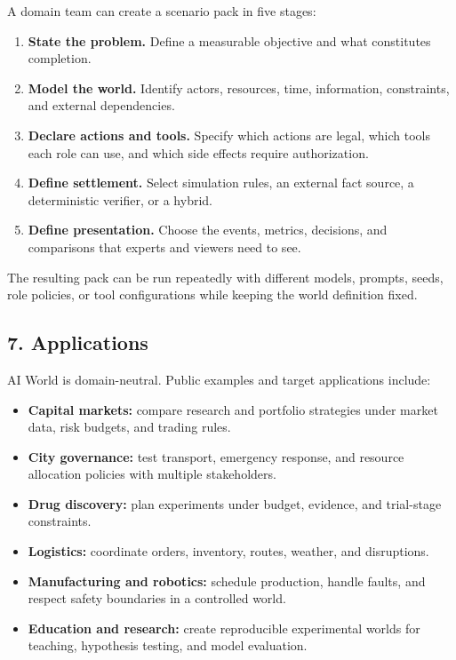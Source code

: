 \documentclass[
]{article}
\providecommand{\tightlist}{%
  \setlength{\itemsep}{0pt}\setlength{\parskip}{0pt}}
\begin{document}
A domain team can create a scenario pack in five stages:

\begin{enumerate}
\def\labelenumi{\arabic{enumi}.}
\tightlist
\item
  \textbf{State the problem.} Define a measurable objective and what
  constitutes completion.
\item
  \textbf{Model the world.} Identify actors, resources, time,
  information, constraints, and external dependencies.
\item
  \textbf{Declare actions and tools.} Specify which actions are legal,
  which tools each role can use, and which side effects require
  authorization.
\item
  \textbf{Define settlement.} Select simulation rules, an external fact
  source, a deterministic verifier, or a hybrid.
\item
  \textbf{Define presentation.} Choose the events, metrics, decisions,
  and comparisons that experts and viewers need to see.
\end{enumerate}

The resulting pack can be run repeatedly with different models, prompts,
seeds, role policies, or tool configurations while keeping the world
definition fixed.

\subsection{7. Applications}\label{7-applications}

AI World is domain-neutral. Public examples and target applications
include:

\begin{itemize}
\tightlist
\item
  \textbf{Capital markets:} compare research and portfolio strategies
  under market data, risk budgets, and trading rules.
\item
  \textbf{City governance:} test transport, emergency response, and
  resource allocation policies with multiple stakeholders.
\item
  \textbf{Drug discovery:} plan experiments under budget, evidence, and
  trial-stage constraints.
\item
  \textbf{Logistics:} coordinate orders, inventory, routes, weather, and
  disruptions.
\item
  \textbf{Manufacturing and robotics:} schedule production, handle
  faults, and respect safety boundaries in a controlled world.
\item
  \textbf{Education and research:} create reproducible experimental
  worlds for teaching, hypothesis testing, and model evaluation.
\end{itemize}
\end{document}
